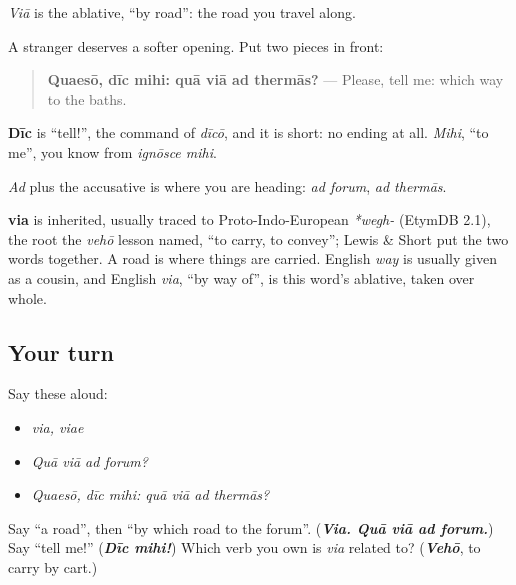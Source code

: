 \emph{Viā} is the ablative, \textquotedblleft{}by road\textquotedblright{}: the road you travel along.

\begin{grammarlens}[title={Grammar Lens: asking politely}]
A stranger deserves a softer opening. Put two pieces in front:

\begin{quote}
\textbf{Quaesō, dīc mihi: quā viā ad thermās?} — Please, tell me: which way to the baths.
\end{quote}

\textbf{Dīc} is \textquotedblleft{}tell!\textquotedblright{}, the command of \emph{dīcō}, and it is short: no ending at all. \emph{Mihi}, \textquotedblleft{}to me\textquotedblright{}, you know from \emph{ignōsce mihi}.

\emph{Ad} plus the accusative is where you are heading: \emph{ad forum}, \emph{ad thermās}.
\end{grammarlens}

\begin{cousinweb}
\textbf{via} is inherited, usually traced to Proto-Indo-European \emph{*wegh-} (EtymDB 2.1), the root the \emph{vehō} lesson named, \textquotedblleft{}to carry, to convey\textquotedblright{}; Lewis \& Short put the two words together. A road is where things are carried. English \emph{way} is usually given as a cousin, and English \emph{via}, \textquotedblleft{}by way of\textquotedblright{}, is this word's ablative, taken over whole.
\end{cousinweb}

\subsection*{Your turn}
Say these aloud:

\begin{itemize}
\raggedright
  \item \emph{via, viae}
  \item \emph{Quā viā ad forum?}
  \item \emph{Quaesō, dīc mihi: quā viā ad thermās?}
\end{itemize}

\begin{tcolorbox}[breakable,colback=teal!4,colframe=teal!35!black,title={Before you move on}]
Say \textquotedblleft{}a road\textquotedblright{}, then \textquotedblleft{}by which road to the forum\textquotedblright{}. (\emph{\textbf{Via. Quā viā ad forum.}}) Say \textquotedblleft{}tell me!\textquotedblright{} (\emph{\textbf{Dīc mihi!}}) Which verb you own is \emph{via} related to? (\emph{\textbf{Vehō}}, to carry by cart.)
\end{tcolorbox}
